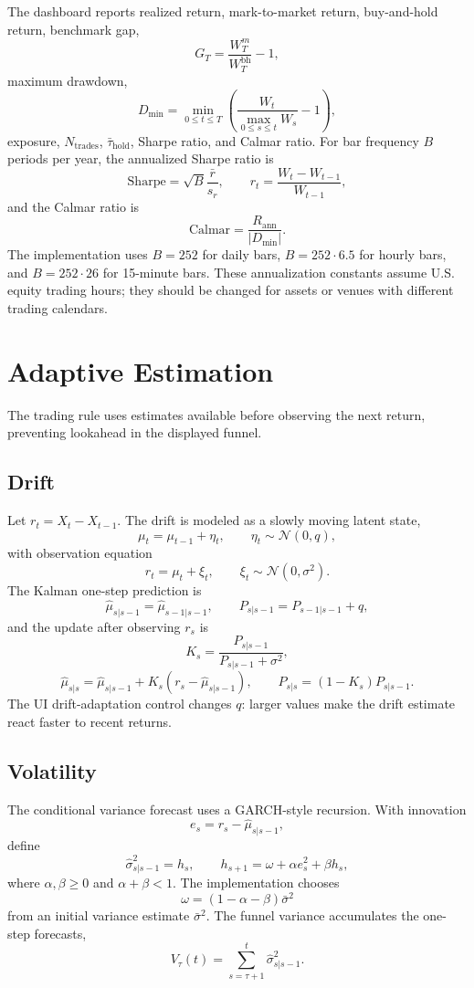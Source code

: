 \documentclass[11pt]{article}
\begin{document}
The dashboard reports realized return, mark-to-market return, buy-and-hold return, benchmark gap,
\[
G_T=\frac{W_T^m}{W_T^{\mathrm{bh}}}-1,
\]
maximum drawdown,
\[
D_{\min}=\min_{0\leq t\leq T}
\left(
\frac{W_t}{\max_{0\leq s\leq t}W_s}-1
\right),
\]
exposure, \(N_{\mathrm{trades}}\), \(\bar\tau_{\mathrm{hold}}\), Sharpe ratio, and Calmar ratio. For bar frequency \(B\) periods per year, the annualized Sharpe ratio is
\[
\mathrm{Sharpe}
=
\sqrt{B}\frac{\bar r}{s_r},
\qquad
r_t=\frac{W_t-W_{t-1}}{W_{t-1}},
\]
and the Calmar ratio is
\[
\mathrm{Calmar}
=
\frac{R_{\mathrm{ann}}}{|D_{\min}|}.
\]
The implementation uses \(B=252\) for daily bars, \(B=252\cdot 6.5\) for hourly bars, and \(B=252\cdot 26\) for 15-minute bars. These annualization constants assume U.S. equity trading hours; they should be changed for assets or venues with different trading calendars.

\section{Adaptive Estimation}

The trading rule uses estimates available before observing the next return, preventing lookahead in the displayed funnel.

\subsection{Drift}

Let \(r_t=X_t-X_{t-1}\). The drift is modeled as a slowly moving latent state,
\[
\mu_t=\mu_{t-1}+\eta_t,
\qquad
\eta_t\sim\mathcal N(0,q),
\]
with observation equation
\[
r_t=\mu_t+\xi_t,
\qquad
\xi_t\sim\mathcal N(0,\sigma^2).
\]
The Kalman one-step prediction is
\[
\hat\mu_{s|s-1}=\hat\mu_{s-1|s-1},
\qquad
P_{s|s-1}=P_{s-1|s-1}+q,
\]
and the update after observing \(r_s\) is
\[
K_s=\frac{P_{s|s-1}}{P_{s|s-1}+\sigma^2},
\]
\[
\hat\mu_{s|s}
=
\hat\mu_{s|s-1}
+K_s(r_s-\hat\mu_{s|s-1}),
\qquad
P_{s|s}=(1-K_s)P_{s|s-1}.
\]
The UI drift-adaptation control changes \(q\): larger values make the drift estimate react faster to recent returns.

\subsection{Volatility}

The conditional variance forecast uses a GARCH-style recursion. With innovation
\[
e_s=r_s-\hat\mu_{s|s-1},
\]
define
\[
\hat\sigma^2_{s|s-1}=h_s,
\qquad
h_{s+1}=\omega+\alpha e_s^2+\beta h_s,
\]
where \(\alpha,\beta\geq 0\) and \(\alpha+\beta<1\). The implementation chooses
\[
\omega=(1-\alpha-\beta)\bar\sigma^2
\]
from an initial variance estimate \(\bar\sigma^2\). The funnel variance accumulates the one-step forecasts,
\[
V_\tau(t)=\sum_{s=\tau+1}^{t}\hat\sigma^2_{s|s-1}.
\]
\end{document}
